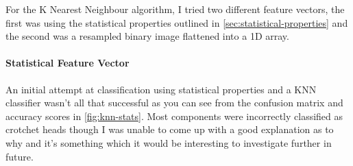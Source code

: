 For the K Nearest Neighbour algorithm, I tried two different feature vectors, the first was using the statistical properties outlined in \cref{sec:statistical-properties} and the second was a resampled binary image flattened into a 1D array.

\paragraph{Statistical Feature Vector}
\label{sec:knn-stats}

An initial attempt at classification using statistical properties and a KNN classifier wasn't all that successful as you can see from the confusion matrix and accuracy scores in \cref{fig:knn-stats}. Most components were incorrectly classified as crotchet heads though I was unable to come up with a good explanation as to why and it's something which it would be interesting to investigate further in future.

